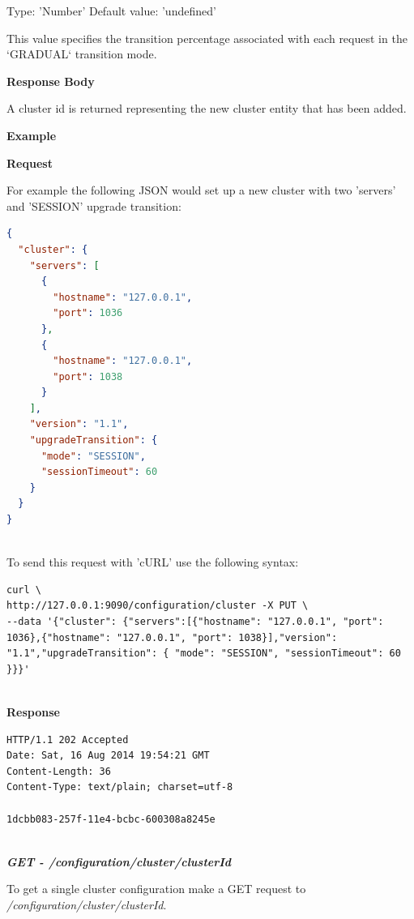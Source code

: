 \documentclass[a4paper,11pt,twoside]{article}
\begin{document}
\noindent
Type: 'Number' Default value: 'undefined'\smallskip

\noindent
This value specifies the transition percentage associated with each request in the `GRADUAL` transition mode. \bigskip

\noindent
\textbf{Response Body}

\noindent
A cluster id is returned representing the new cluster entity that has been added. \bigskip

\noindent
\textbf{Example}\bigskip

\noindent
\textbf{Request}

\noindent
For example the following JSON would set up a new cluster with two 'servers' and 'SESSION' upgrade transition:\bigskip

\begin{lstlisting}[language=json]
{
  "cluster": {
    "servers": [
      {
        "hostname": "127.0.0.1", 
        "port": 1036
      },  
      {
        "hostname": "127.0.0.1", 
        "port": 1038
      }
    ], 
    "version": "1.1", 
    "upgradeTransition": {
      "mode": "SESSION", 
      "sessionTimeout": 60
    }
  }
}
\end{lstlisting}

\noindent \\
To send this request with 'cURL' use the following syntax:\bigskip

\begin{lstlisting}[language=terminal]
curl \
http://127.0.0.1:9090/configuration/cluster -X PUT \
--data '{"cluster": {"servers":[{"hostname": "127.0.0.1", "port": 1036},{"hostname": "127.0.0.1", "port": 1038}],"version": "1.1","upgradeTransition": { "mode": "SESSION", "sessionTimeout": 60 }}}'
\end{lstlisting}

\noindent \\
\textbf{Response}

\begin{lstlisting}[language=terminal]
HTTP/1.1 202 Accepted
Date: Sat, 16 Aug 2014 19:54:21 GMT
Content-Length: 36
Content-Type: text/plain; charset=utf-8
 
1dcbb083-257f-11e4-bcbc-600308a8245e
\end{lstlisting}

\noindent \\
\textit{\textbf{GET - /configuration/cluster/{clusterId}}}\bigskip

\noindent 
To get a single cluster configuration make a GET request to \textit{/configuration/cluster/{clusterId}}.\bigskip 
\end{document}
